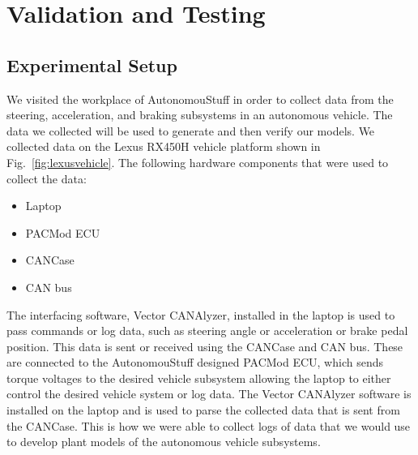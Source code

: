 \documentclass[conference]{IEEEtran}
\begin{document}
\section{Validation and Testing} \label{sec:simresults}

\subsection{Experimental Setup}
\label{sec:experimentalSetup}

We visited the workplace of AutonomouStuff in order to collect
data from the steering, acceleration, and braking subsystems in an autonomous
vehicle. The data we collected will be used to generate and then verify our
models. We collected data on the Lexus RX450H vehicle platform shown in
Fig.~\ref{fig:lexusvehicle}. %
The following hardware components that were used to collect the data:
	\begin{itemize}
    		\item Laptop
    		\item PACMod ECU
    		\item CANCase
    		\item CAN bus
 	\end{itemize}
The interfacing software, Vector CANAlyzer, installed in the laptop is used to pass commands or log data, such as steering angle or acceleration or brake pedal position. This data is sent or received using the CANCase and CAN bus. These are connected to the AutonomouStuff designed PACMod ECU, which sends torque voltages to the desired vehicle subsystem allowing the laptop to either control the desired vehicle system or log data. The Vector CANAlyzer software is installed on the laptop and is used to parse the collected data that is sent from the CANCase. This is how we were able to collect logs of data that we would use to develop plant models of the autonomous vehicle subsystems.
\end{document}
